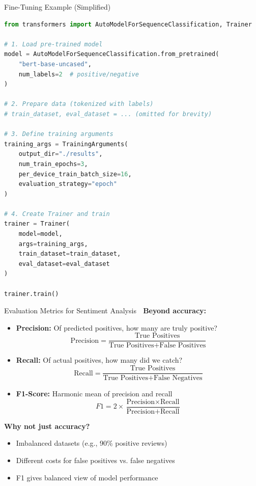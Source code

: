 \documentclass[aspectratio=169]{beamer}
\begin{document}
\begin{frame}[fragile]{Fine-Tuning Example (Simplified) 🔧}
    \begin{lstlisting}[language=Python]
from transformers import AutoModelForSequenceClassification, Trainer

# 1. Load pre-trained model
model = AutoModelForSequenceClassification.from_pretrained(
    "bert-base-uncased",
    num_labels=2  # positive/negative
)

# 2. Prepare data (tokenized with labels)
# train_dataset, eval_dataset = ... (omitted for brevity)

# 3. Define training arguments
training_args = TrainingArguments(
    output_dir="./results",
    num_train_epochs=3,
    per_device_train_batch_size=16,
    evaluation_strategy="epoch"
)

# 4. Create Trainer and train
trainer = Trainer(
    model=model,
    args=training_args,
    train_dataset=train_dataset,
    eval_dataset=eval_dataset
)

trainer.train()
    \end{lstlisting}
\end{frame}

\begin{frame}[shrink=10]{Evaluation Metrics for Sentiment Analysis 📏}
    \textbf{Beyond accuracy:}

    \begin{itemize}\setlength{\itemsep}{0pt}
        \item \textbf{Precision:} Of predicted positives, how many are truly positive?
        \[
        \text{Precision} = \frac{\text{True Positives}}{\text{True Positives} + \text{False Positives}}
        \]

        \item \textbf{Recall:} Of actual positives, how many did we catch?
        \[
        \text{Recall} = \frac{\text{True Positives}}{\text{True Positives} + \text{False Negatives}}
        \]

        \item \textbf{F1-Score:} Harmonic mean of precision and recall
        \[
        F1 = 2 \times \frac{\text{Precision} \times \text{Recall}}{\text{Precision} + \text{Recall}}
        \]
    \end{itemize}

    \vspace{0.5em}
    \textbf{Why not just accuracy?}
    \begin{itemize}\setlength{\itemsep}{0pt}
        \item Imbalanced datasets (e.g., 90\% positive reviews)
        \item Different costs for false positives vs. false negatives
        \item F1 gives balanced view of model performance
    \end{itemize}
\end{frame}
\end{document}
